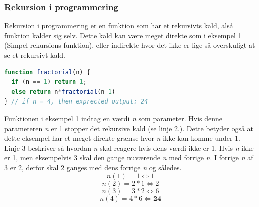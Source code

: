 \documentclass[12pt]{article}
\begin{document}
\subsubsection{Rekursion i programmering}\label{Rekursion i programmering}
Rekursion i programmering er en funktion som har et rekursivts kald, alså funktion kalder sig selv. Dette kald kan være meget direkte som i eksempel 1 (Simpel rekursions funktion), eller indirekte hvor det ikke er lige så overskuligt at se et rekursivt kald.
\begin{lstlisting}[language=JavaScript, caption=Simpel rekursions funktion]
function fractorial(n) {        
  if (n == 1) return 1; 
  else return n*fractorial(n-1) 
} // if n = 4, then exprected output: 24
\end{lstlisting}
Funktionen i eksempel 1 indtag en værdi \textit{n} som parameter. Hvis denne parameteren \textit{n} er 1 stopper det rekursive kald (se linje 2.). Dette betyder også at dette eksempel har et meget direkte grænse hvor \textit{n} ikke kan komme under 1. Linje 3 beskriver så hvordan \textit{n} skal reagere hvis dens værdi ikke er 1. Hvis \textit{n} ikke er 1, men eksempelvis 3 skal den gange nuværende \textit{n} med forrige \textit{n}. I forrige \textit{n} af 3 er 2, derfor skal 2 ganges med dens forrige \textit{n} og således.
\[n(1) = 1 \Leftrightarrow 1\] 
\[n(2) = 2*1 \Leftrightarrow   2\]
\[n(3) = 3*2 \Leftrightarrow   6\]
\[n(4) = 4*6 \Leftrightarrow  \textbf{24}\]

\end{document}
